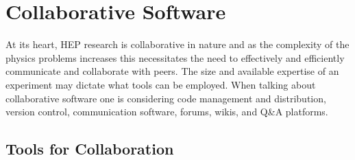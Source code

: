 \section{Collaborative Software}
\begin{comment}
T. Aarrestad et al. [HEP Software Foundation], “HL-LHC Computing Review: Common Tools and Community Software”, arXiv:2008.13636 [physics.comp-ph ]] (pdf).~\cite{stewart_graeme_andrew_2020_4009114}

Simone Campana, Alessandro Di Girolamo, Paul Laycock, Zach Marshall, Heidi Schellman, Graeme A Stewart. ”HEP computing collaborations for the challenges of the next decade”, arXiv:2203.07237 [physics.comp-ph] (pdf).~\cite{arxiv.2203.07237}

Dave Casper, Maria Elena Monzani, Benjamin Nachman, Costas Andreopoulos, Stephen Bailey, Deborah Bard, et al. ”Software and Computing for Small HEP Experiments“, arXiv:2203.07645 [hep-ex] (pdf). (also under EF0, NF0, RF0, CF0)~\cite{arxiv.2203.07645}

\end{comment}

At its heart, HEP research is collaborative in nature and as the complexity of the physics problems increases this necessitates the need to effectively and efficiently communicate and collaborate with peers.
The size and available expertise of an experiment may dictate what tools can be employed. When talking about collaborative software one is considering code management and distribution, version control, communication software, forums, wikis, and Q\&A platforms.
\subsection{Tools for Collaboration}

